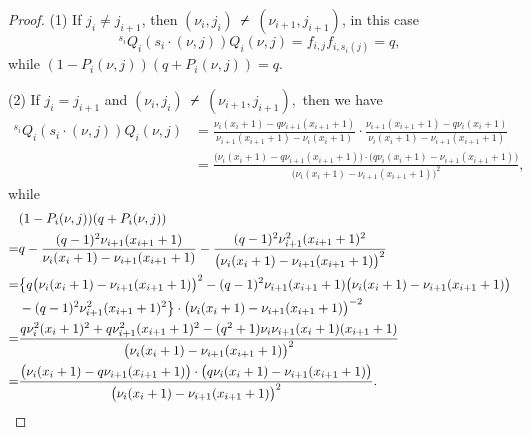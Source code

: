 \documentclass[11pt, reqno]{amsart} \textwidth=14.9cm \oddsidemargin=1cm \evensidemargin=1cm
\theoremstyle{definition}
\def\nslash{\:\notslash\:}
\numberwithin{equation}{section}
\begin{document}
\begin{proof}
(1) If $j_{i}\neq j_{i+1}$, then $(\nu_i, j_{i})\nslash (\nu_{i+1}, j_{i+1})$, in this case \[{}^{s_{i}}Q_{i}(s_{i}\cdot(\nu, j))Q_{i}(\nu, j)=f_{i,j}f_{i, s_{i}(j)}=q,\] while $(1-P_{i}(\nu, j))(q+P_{i}(\nu, j))=q.$\vspace{0.25cm}

(2) If $j_{i}= j_{i+1}$ and $(\nu_i, j_{i})\nslash (\nu_{i+1}, j_{i+1}),$ then we have
\begin{align*}
{}^{s_{i}}Q_{i}(s_{i}\cdot(\nu, j))Q_{i}(\nu, j)&=\frac{\nu_{i}(x_{i}+1)-q\nu_{i+1}(x_{i+1}+1)}
{\nu_{i+1}(x_{i+1}+1)-\nu_{i}(x_{i}+1)}\cdot\frac{\nu_{i+1}(x_{i+1}+1)-q\nu_{i}(x_{i}+1)}
{\nu_{i}(x_{i}+1)-\nu_{i+1}(x_{i+1}+1)}\\
&=\frac{\big(\nu_{i}(x_{i}+1)-q\nu_{i+1}(x_{i+1}+1)\big)\cdot\big(q\nu_{i}(x_{i}+1)-\nu_{i+1}(x_{i+1}+1)\big)}{\big(\nu_{i}(x_{i}+1)-\nu_{i+1}(x_{i+1}+1)\big)^{2}},
\end{align*}
while
\begin{align}
&(1-P_{i}(\nu, j))(q+P_{i}(\nu, j))\notag\\=&q-\frac{(q-1)^{2}\nu_{i+1}(x_{i+1}+1)}{\nu_{i}(x_{i}+1)-\nu_{i+1}(x_{i+1}+1)}-
\frac{(q-1)^{2}\nu_{i+1}^{2}(x_{i+1}+1)^{2}}{\big(\nu_{i}(x_{i}+1)-\nu_{i+1}(x_{i+1}+1)\big)^{2}}\notag\\
=&\big\{q\big(\nu_{i}(x_{i}+1)-\nu_{i+1}(x_{i+1}+1)\big)^{2}-(q-1)^{2}\nu_{i+1}(x_{i+1}+1)\big(\nu_{i}(x_{i}+1)-
\nu_{i+1}(x_{i+1}+1)\big)\notag\\
&-(q-1)^{2}\nu_{i+1}^{2}(x_{i+1}+1)^{2}\big\}\cdot\big(\nu_{i}(x_{i}+1)-\nu_{i+1}(x_{i+1}+1)\big)^{-2}\notag\\
=&\frac{q\nu_{i}^{2}(x_{i}+1)^{2}+q\nu_{i+1}^{2}(x_{i+1}+1)^{2}-(q^{2}+1)\nu_{i}\nu_{i+1}(x_{i}+1)(x_{i+1}+1)}
{\big(\nu_{i}(x_{i}+1)-\nu_{i+1}(x_{i+1}+1)\big)^{2}}\notag\\
=&\frac{\big(\nu_{i}(x_{i}+1)-q\nu_{i+1}(x_{i+1}+1)\big)\cdot\big(q\nu_{i}(x_{i}+1)-\nu_{i+1}(x_{i+1}+1)\big)}
{\big(\nu_{i}(x_{i}+1)-\nu_{i+1}(x_{i+1}+1)\big)^{2}}.\label{Q-relations3}
\end{align}\vspace{0.25cm}


\end{proof}
\end{document}

